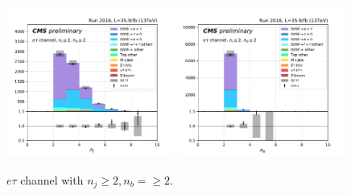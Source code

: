 \begin{figure}[ht]
    \includegraphics[width=0.49\textwidth]{chapters/Appendix/sectionPlots/figures/kinematics_pickles/etau/2b/etau_2b_nJets.pdf}
    \includegraphics[width=0.49\textwidth]{chapters/Appendix/sectionPlots/figures/kinematics_pickles/etau/2b/etau_2b_nBJets.pdf}
    
    \caption{$e\tau$ channel with $n_j\geq2, n_b=\geq2$.}
\end{figure}


